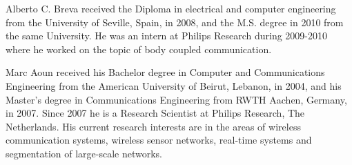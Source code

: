 \documentclass[10pt]{IEEEtran}
\begin{document}
\vspace*{-2\baselineskip}
\begin{IEEEbiographynophoto}{Alberto C. Breva} received the Diploma in electrical and computer engineering from the University of Seville, Spain, in 2008, and the M.S. degree in 2010 from the same University. He was an intern at Philips Research during 2009-2010 where he worked on the topic of body coupled communication.
\end{IEEEbiographynophoto}

\vspace*{-2\baselineskip}
\begin{IEEEbiographynophoto}{Marc Aoun}  received his Bachelor degree in Computer and Communications Engineering from the American University of Beirut, Lebanon, in 2004, and his Master’s degree in Communications Engineering from RWTH Aachen, Germany, in 2007. Since 2007 he is a Research Scientist at Philips Research, The Netherlands. His current research interests are in the areas of wireless communication systems, wireless sensor networks, real-time systems and segmentation of large-scale networks.
\end{IEEEbiographynophoto}
\end{document}
